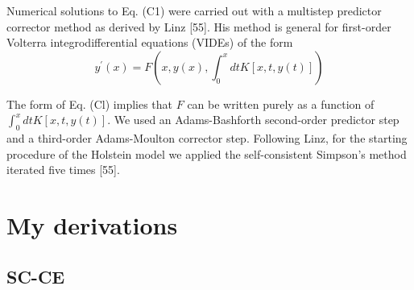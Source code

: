 Numerical solutions to Eq. (C1) were carried out with a multistep predictor corrector method as derived by Linz [55]. His method is general for first-order Volterra integrodifferential equations (VIDEs) of the form
$$
y^{\prime}(x)=F\left(x, y(x), \int_0^x d t K[x, t, y(t)]\right)
$$

The form of Eq. (Cl) implies that $F$ can be written purely as a function of $\int_0^x d t K[x, t, y(t)]$. We used an Adams-Bashforth second-order predictor step and a third-order Adams-Moulton corrector step. Following Linz, for the starting procedure of the Holstein model we applied the self-consistent Simpson's method iterated five times [55].
\section{My derivations}
\subsection{SC-CE}


